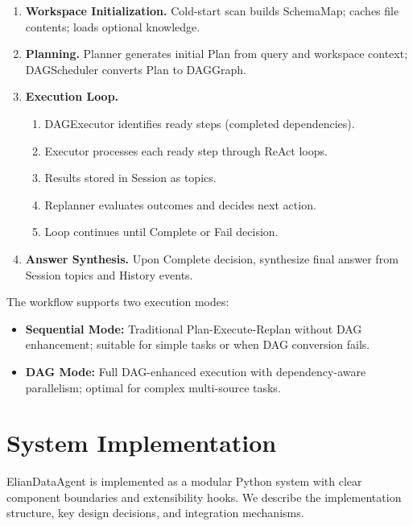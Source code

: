 \documentclass{article}
\theoremstyle{definition}
\begin{document}
\begin{enumerate}[leftmargin=*, label=\textbf{Phase \arabic*.}]
    \item \textbf{Workspace Initialization.}
    Cold-start scan builds SchemaMap; caches file contents; loads optional knowledge.

    \item \textbf{Planning.}
    Planner generates initial Plan from query and workspace context; DAGScheduler converts Plan to DAGGraph.

    \item \textbf{Execution Loop.}
    \begin{enumerate}[leftmargin=1.5em]
        \item DAGExecutor identifies ready steps (completed dependencies).
        \item Executor processes each ready step through ReAct loops.
        \item Results stored in Session as topics.
        \item Replanner evaluates outcomes and decides next action.
        \item Loop continues until Complete or Fail decision.
    \end{enumerate}

    \item \textbf{Answer Synthesis.}
    Upon Complete decision, synthesize final answer from Session topics and History events.
\end{enumerate}

The workflow supports two execution modes:
\begin{itemize}[leftmargin=1.5em]
    \item \textbf{Sequential Mode:} Traditional Plan-Execute-Replan without DAG enhancement; suitable for simple tasks or when DAG conversion fails.
    \item \textbf{DAG Mode:} Full DAG-enhanced execution with dependency-aware parallelism; optimal for complex multi-source tasks.
\end{itemize}


\section{System Implementation}

ElianDataAgent is implemented as a modular Python system with clear component boundaries and extensibility hooks. We describe the implementation structure, key design decisions, and integration mechanisms.
\end{document}
